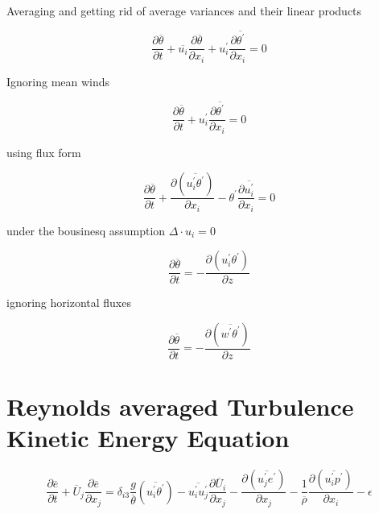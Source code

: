 Averaging and getting rid of average variances and their linear products

\begin{equation}
\frac{\partial \overline{\theta}}{\partial t} + \overline{u_{i}}\frac{\partial \overline{\theta}}{\partial x_{i}} + u_{i}^{'}\frac{\partial \overline{\theta^{'}}}{\partial x_{i}} = 0
\end{equation}

Ignoring mean winds

\begin{equation}
\frac{\partial \overline{\theta}}{\partial t} + u_{i}^{'}\frac{\partial \overline{\theta^{'}}}{\partial x_{i}} = 0
\end{equation}

using flux form

\begin{equation}
\frac{\partial \overline{\theta}}{\partial t} + \frac{\partial(\overline{u_{i}^{'}\theta^{'}})}{\partial x_{i}} - \theta^{'}\frac{\partial \overline{u_{i}^{'}}}{\partial x_{i}}= 0
\end{equation}

under the bousinesq assumption $\Delta \cdot u_{i} = 0$

\begin{equation}
\frac{\partial \overline{\theta}}{\partial t} = -\frac{\partial(u_{i}^{'}\theta^{'})}{\partial z}
\end{equation}

ignoring horizontal fluxes

\begin{equation}
\label{eq:warming1}
\frac{\partial \overline{\theta}}{\partial t} = -\frac{\partial(\overline{w^{'}\theta^{'}})}{\partial z}
\end{equation}

\section{Reynolds averaged Turbulence Kinetic Energy Equation}

\begin{equation}
\frac{\partial \overline{e}}{\partial t} + \overline{U}_{j} \frac{\partial \overline{e}}{\partial x_{j}} = \delta_{i3}  \frac{g}{\overline{\theta}} \left( \overline{u_{i}^{'}\theta^{'}} \right) - \overline{u_{i}^{'}u_{j}^{'}}\frac{\partial \overline{U}_{i}}{\partial x_{j}} - \frac{ \partial \left( \overline{u_{j}^{'}e^{'}} \right)}{\partial x_{j}} - \frac{1}{\overline{\rho}} \frac{\partial \left( \overline{u_{i}^{'} p^{'}} \right) }{\partial x_{i}} - \epsilon
\end{equation}


